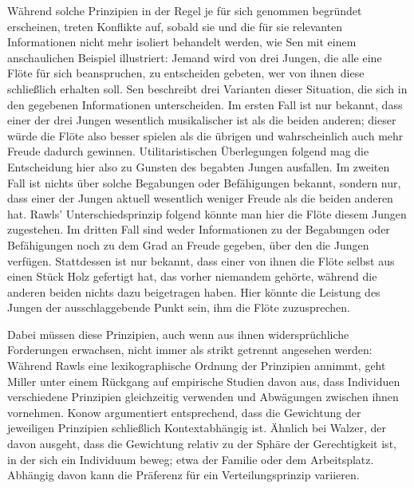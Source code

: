 \documentclass[a4paper]{thesis}
\begin{document}
Während solche Prinzipien in der Regel je für sich genommen begründet erscheinen, treten Konflikte auf, sobald sie und die für sie relevanten Informationen nicht mehr isoliert behandelt werden, wie Sen mit einem anschaulichen Beispiel illustriert: Jemand wird von drei Jungen, die alle eine Flöte für sich beanspruchen, zu entscheiden gebeten, wer von ihnen diese schließlich erhalten soll. Sen beschreibt drei Varianten dieser Situation, die sich in den gegebenen Informationen unterscheiden. Im ersten Fall ist nur bekannt, dass einer der drei Jungen wesentlich musikalischer ist als die beiden anderen; dieser würde die Flöte also besser spielen als die übrigen und wahrscheinlich auch mehr Freude dadurch gewinnen. Utilitaristischen Überlegungen folgend mag die Entscheidung hier also zu Gunsten des begabten Jungen ausfallen. Im zweiten Fall ist nichts über solche Begabungen oder Befähigungen bekannt, sondern nur, dass einer der Jungen aktuell wesentlich weniger Freude als die beiden anderen hat. Rawls' Unterschiedsprinzip folgend könnte man hier die Flöte diesem Jungen zugestehen. Im dritten Fall sind weder Informationen zu der Begabungen oder Befähigungen noch zu dem Grad an Freude gegeben, über den die Jungen verfügen. Stattdessen ist nur bekannt, dass einer von ihnen die Flöte selbst aus einen Stück Holz gefertigt hat, das vorher niemandem gehörte, während die anderen beiden nichts dazu beigetragen haben. Hier könnte die Leistung des Jungen der ausschlaggebende Punkt sein, ihm die Flöte zuzusprechen.

Dabei müssen diese Prinzipien, auch wenn aus ihnen widersprüchliche Forderungen erwachsen, nicht immer als strikt getrennt angesehen werden: Während Rawls eine lexikographische Ordnung der Prinzipien annimmt, geht Miller unter einem Rückgang auf empirische Studien davon aus, dass Individuen verschiedene Prinzipien gleichzeitig verwenden und Abwägungen zwischen ihnen vornehmen. Konow argumentiert entsprechend, dass die Gewichtung der jeweiligen Prinzipien schließlich Kontextabhängig ist. Ähnlich bei Walzer,  der davon ausgeht, dass die Gewichtung relativ zu der Sphäre der Gerechtigkeit ist, in der sich ein Individuum beweg; etwa der Familie oder dem Arbeitsplatz. Abhängig davon kann die Präferenz für ein Verteilungsprinzip variieren.
\end{document}
